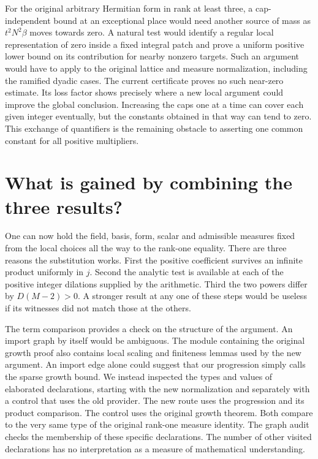 \documentclass[12pt,letterpaper]{article}
\begin{document}
For the original arbitrary Hermitian form in rank at least three, a cap-independent bound at an exceptional place would need another source of mass as $t^2N^2\beta$ moves towards zero. A natural test would identify a regular local representation of zero inside a fixed integral patch and prove a uniform positive lower bound on its contribution for nearby nonzero targets. Such an argument would have to apply to the original lattice and measure normalization, including the ramified dyadic cases. The current certificate proves no such near-zero estimate. Its loss factor shows precisely where a new local argument could improve the global conclusion. Increasing the caps one at a time can cover each given integer eventually, but the constants obtained in that way can tend to zero. This exchange of quantifiers is the remaining obstacle to asserting one common constant for all positive multipliers.

\section{What is gained by combining the three results?}
One can now hold the field, basis, form, scalar and admissible measures fixed from the local choices all the way to the rank-one equality. There are three reasons the substitution works. First the positive coefficient survives an infinite product uniformly in $j$. Second the analytic test is available at each of the positive integer dilations supplied by the arithmetic. Third the two powers differ by $D(M-2)>0$. A stronger result at any one of these steps would be useless if its witnesses did not match those at the others.

The term comparison provides a check on the structure of the argument. An import graph by itself would be ambiguous. The module containing the original growth proof also contains local scaling and finiteness lemmas used by the new argument. An import edge alone could suggest that our progression simply calls the sparse growth bound. We instead inspected the types and values of elaborated declarations, starting with the new normalization and separately with a control that uses the old provider. The new route uses the progression and its product comparison. The control uses the original growth theorem. Both compare to the very same type of the original rank-one measure identity. The graph audit checks the membership of these specific declarations. The number of other visited declarations has no interpretation as a measure of mathematical understanding.
\end{document}
